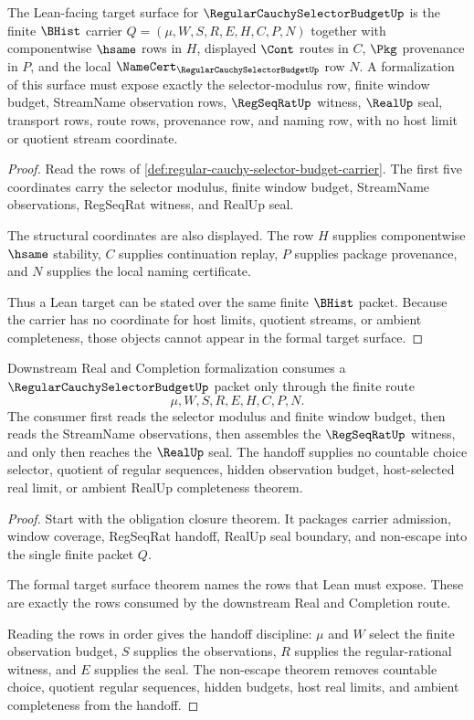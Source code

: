 \begin{theorem}
\label{thm:regular-cauchy-selector-budget-formal-target-surface}
The Lean-facing target surface for $\RegularCauchySelectorBudgetUp$ is the finite $\BHist$ carrier $Q=(\mu,W,S,R,E,H,C,P,N)$ together with componentwise $\hsame$ rows in $H$, displayed $\Cont$ routes in $C$, $\Pkg$ provenance in $P$, and the local $\NameCert_{\RegularCauchySelectorBudgetUp}$ row $N$. A formalization of this surface must expose exactly the selector-modulus row, finite window budget, StreamName observation rows, $\RegSeqRatUp$ witness, $\RealUp$ seal, transport rows, route rows, provenance row, and naming row, with no host limit or quotient stream coordinate.
\end{theorem}
\begin{proof}
Read the rows of \autoref{def:regular-cauchy-selector-budget-carrier}. The first five coordinates carry the selector modulus, finite window budget, StreamName observations, RegSeqRat witness, and RealUp seal.

The structural coordinates are also displayed. The row $H$ supplies componentwise $\hsame$ stability, $C$ supplies continuation replay, $P$ supplies package provenance, and $N$ supplies the local naming certificate.

Thus a Lean target can be stated over the same finite $\BHist$ packet. Because the carrier has no coordinate for host limits, quotient streams, or ambient completeness, those objects cannot appear in the formal target surface.
\end{proof}

\begin{theorem}
\label{thm:regular-cauchy-selector-budget-verification-handoff}
Downstream Real and Completion formalization consumes a $\RegularCauchySelectorBudgetUp$ packet only through the finite route
$$
\mu,W,S,R,E,H,C,P,N.
$$
The consumer first reads the selector modulus and finite window budget, then reads the StreamName observations, then assembles the $\RegSeqRatUp$ witness, and only then reaches the $\RealUp$ seal. The handoff supplies no countable choice selector, quotient of regular sequences, hidden observation budget, host-selected real limit, or ambient RealUp completeness theorem.
\end{theorem}
\begin{proof}
Start with the obligation closure theorem. It packages carrier admission, window coverage, RegSeqRat handoff, RealUp seal boundary, and non-escape into the single finite packet $Q$.

The formal target surface theorem names the rows that Lean must expose. These are exactly the rows consumed by the downstream Real and Completion route.

Reading the rows in order gives the handoff discipline: $\mu$ and $W$ select the finite observation budget, $S$ supplies the observations, $R$ supplies the regular-rational witness, and $E$ supplies the seal. The non-escape theorem removes countable choice, quotient regular sequences, hidden budgets, host real limits, and ambient completeness from the handoff.
\end{proof}


